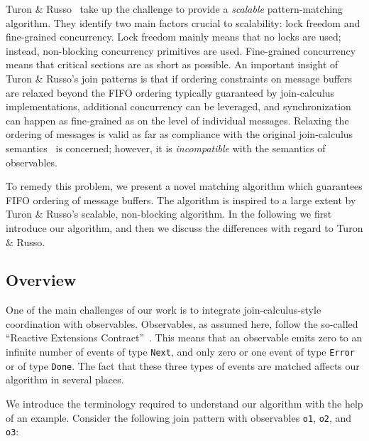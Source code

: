 \documentclass[runningheads]{llncs}
\begin{document}
\begin{sloppypar}
Turon \& Russo~\cite{Turon:2011} take up the challenge to provide a {\em
scalable} pattern-matching algorithm. They identify two main factors crucial
to scalability: lock freedom and fine-grained concurrency. Lock freedom mainly
means that no locks are used; instead, non-blocking concurrency primitives are
used. Fine-grained concurrency means that critical sections are as short as
possible. An important insight of Turon \& Russo's join patterns is that if
ordering constraints on message buffers are relaxed beyond the FIFO ordering
typically guaranteed by join-calculus implementations, additional concurrency
can be leveraged, and synchronization can happen as fine-grained as on the
level of individual messages. Relaxing the ordering of messages is valid as
far as compliance with the original join-calculus
semantics~\cite{Fournet:1996} is concerned; however, it is {\em incompatible}
with the semantics of observables.

To remedy this problem, we present a novel matching algorithm which guarantees
FIFO ordering of message buffers. The algorithm is inspired to a large extent
by Turon \& Russo's scalable, non-blocking algorithm. In the following we
first introduce our algorithm, and then we discuss the differences with regard
to Turon \& Russo.


\subsection{Overview}

One of the main challenges of our work is to integrate join-calculus-style
coordination with observables. Observables, as assumed here, follow the
so-called ``Reactive Extensions Contract''~\cite{RxContract:2010}. This means
that an observable emits zero to an infinite number of events of type
\verb|Next|, and only zero or one event of type \verb|Error| or of type
\verb|Done|. The fact that these three types of events are matched affects
our algorithm in several places.


We introduce the terminology required to understand our algorithm with the
help of an example. Consider the following join pattern with observables
\verb|o1|, \verb|o2|, and \verb|o3|:


\end{sloppypar}
\end{document}
